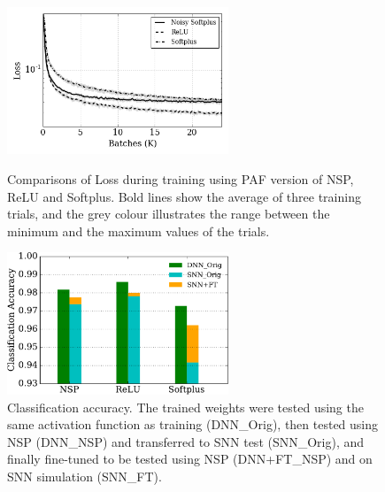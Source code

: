 \documentclass{article}
\begin{document}
	\begin{figure}
		\begin{minipage}[t]{0.48\linewidth}
			\raggedleft
			\includegraphics[width=2.6in]{pics_iconip/8.png}
			\caption{Comparisons of Loss during training using PAF version of NSP, ReLU and Softplus. Bold lines show the average of three training trials, and the grey colour illustrates the range between the minimum and the maximum values of the trials. }
			\label{Fig:loss_ns}
		\end{minipage}%
		\hspace{0.04\linewidth}
		\begin{minipage}[t]{0.48\linewidth}
			\raggedright
			\includegraphics[width=2.6in]{pics_iconip/9-2.pdf}
			\caption{Classification accuracy.
			The trained weights were tested using the same activation function as training (DNN\_Orig), then tested using NSP (DNN\_NSP) and transferred to SNN test (SNN\_Orig), and finally fine-tuned to be tested using NSP (DNN+FT\_NSP) and on SNN simulation (SNN\_FT).  }
			\label{Fig:result_bar}
		\end{minipage}
	\end{figure}
	
\end{document}
